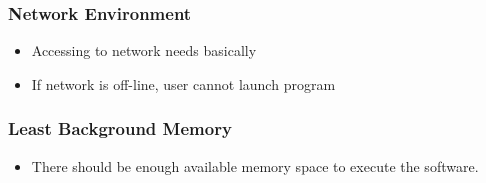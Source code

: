 \documentclass[conference,compsoc, twocolumn]{IEEEtran}
\begin{document}
\subsubsection{Network Environment}
\begin{itemize}
\item Accessing to network needs basically
\item If network is off-line, user cannot launch program
\end{itemize}

\subsubsection{Least Background Memory}
\begin{itemize}
\item There should be enough available memory space to execute the software.
\end{itemize}
\end{document}
